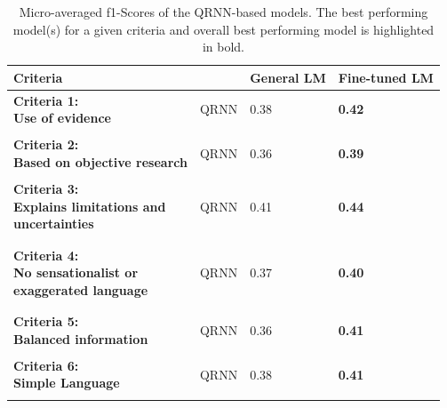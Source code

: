 \documentclass[a4paper,twoside,phd]{BYUPhys}
\begin{document}
\begin{table}[H]
	\centering
	\caption{Micro-averaged f1-Scores of the QRNN-based models. The best performing model(s) for a given criteria and overall best performing model is highlighted in bold.}

		\begin{tabular}{|p{6cm}|p{2cm}|p{3cm}|p{3.3cm}|}
			
			
			\hline
			
			\textbf{Criteria} &  & \textbf{General LM}                                                                       & \textbf{Fine-tuned LM}  \\
			\hline
			
			\multirowcell{2}{\textbf{Criteria 1:} \\ \textbf{Use of evidence} } & QRNN & 0.38 & \textbf{0.42} \\ 
			&  & &\\ 
			\hline
			
			
			\multirowcell{2}{\textbf{Criteria 2:} \\ \textbf{Based on objective research}} 
			& QRNN & 0.36 & \textbf{0.39} \\ 
			&  & &\\ 
			\hline 
			
			
			\multirowcell{3}{\textbf{Criteria 3:} \\ \textbf{ Explains limitations and} \\ \textbf{uncertainties}} 
			& QRNN & 0.41 & \textbf{0.44} \\ 
			& & &\\ & & &\\ 
			\hline 
			
			
			\multirowcell{3}{\textbf{Criteria 4:} \\ \textbf{No sensationalist or} \\ \textbf{exaggerated language}} 
			& QRNN & 0.37 & \textbf{0.40}\\ 
			& & &\\ & & &\\ 
			\hline 
			
			
			\multirowcell{2}{\textbf{Criteria 5:} \\ \textbf{Balanced information}} 
			& QRNN & 0.36 & \textbf{0.41} \\ 
			& & &\\
			\hline 
			
			
			\multirowcell{2}{\textbf{Criteria 6:} \\ \textbf{Simple Language}} & QRNN & 0.38 & \textbf{0.41} \\ 
			& & &\\
			\hline 
			

\end{tabular}
\end{table}
\end{document}
